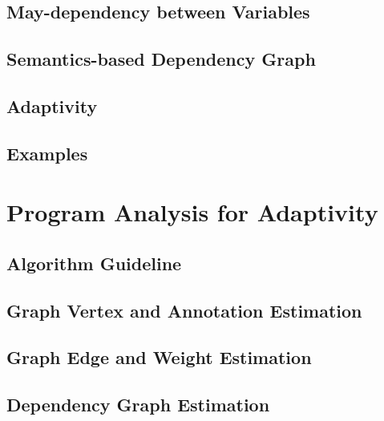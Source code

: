 \documentclass[12pt, letterpaper]{report}   %
\begin{document}
\section{May-dependency between Variables}
\label{sec:dynamic-datadep}


\section{Semantics-based Dependency Graph}
\label{sec:dynamic-graph}


\section{Adaptivity}
\label{sec:dynamic-adapt}


\section{Examples}
\label{sec:dynamic-examples}
%
\clearpage

\chapter{Program Analysis for Adaptivity}
\label{sec:adapt-static}


\section{Algorithm Guideline}
\label{sec:static-overview}


\section{Graph Vertex and Annotation Estimation}
\label{sec:alg_vertexgen}



\section{Graph Edge and Weight Estimation}
\label{sec:alg_weightedgegen}


\section{Dependency Graph Estimation}
\label{sec:alg_graphgen}

\end{document}
